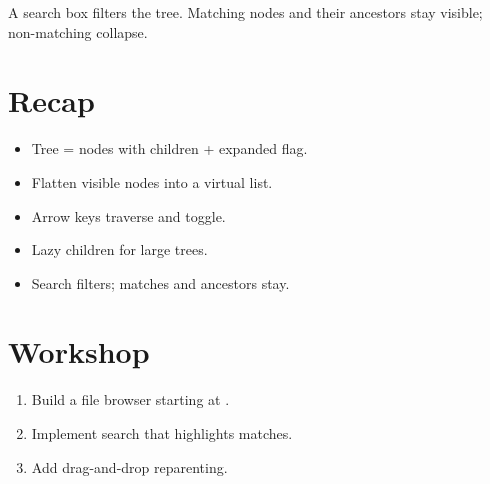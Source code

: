 A search box filters the tree. Matching nodes and their
ancestors stay visible; non-matching collapse.

\section{Recap}

\begin{recap}
\begin{itemize}[leftmargin=*]
  \item Tree = nodes with children + expanded flag.
  \item Flatten visible nodes into a virtual list.
  \item Arrow keys traverse and toggle.
  \item Lazy children for large trees.
  \item Search filters; matches and ancestors stay.
\end{itemize}
\end{recap}

\section*{Workshop}

\begin{enumerate}[leftmargin=*]
  \item Build a file browser starting at \code{/}.
  \item Implement search that highlights matches.
  \item Add drag-and-drop reparenting.
\end{enumerate}
